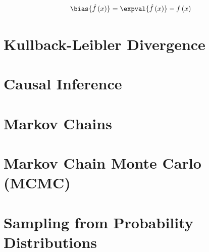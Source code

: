 \begin{equation}\label{eq:stats:bias}
\bias{\hat{f}\left(x\right)} = \expval{\hat{f}\left(x\right)} - f\left(x\right)
\end{equation}

\section{Kullback-Leibler Divergence}
\label{stats:kld}

\section{Causal Inference}
\label{stats:causal_inference}

\section{Markov Chains}
\label{misc:markov_chains}

\section{Markov Chain Monte Carlo (MCMC)}
\label{misc:MCMC}


\subsection{\pymcThree}%
\label{misc:MCMC:PyMC3}

\section{Sampling from Probability Distributions}
\label{misc:sampling_prob_dist}

